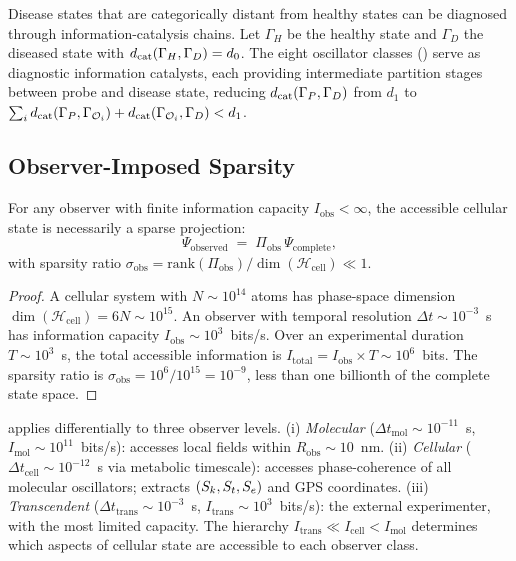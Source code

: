 \begin{corollary}
Disease states that are categorically distant from healthy states can be
diagnosed through information-catalysis chains.  Let $\Gamma_H$ be the healthy
state and $\Gamma_D$ the diseased state with $d_{\mathrm{cat}}(\Gamma_H, \Gamma_D) = d_0$.
The eight oscillator classes () serve as
diagnostic information catalysts, each providing intermediate partition stages
between probe and disease state, reducing $d_{\mathrm{cat}}(\Gamma_P, \Gamma_D)$ from
$d_1$ to $\sum_i d_{\mathrm{cat}}(\Gamma_P, \Gamma_{\mathcal{O}_i}) + d_{\mathrm{cat}}(\Gamma_{\mathcal{O}_i}, \Gamma_D) < d_1$.
\end{corollary}

\subsection{Observer-Imposed Sparsity}

\begin{theorem}
\label{thm:observer-sparsity}
For any observer with finite information capacity $I_\mathrm{obs} < \infty$,
the accessible cellular state is necessarily a sparse projection:
\[
    \Psi_\mathrm{observed} \;=\; \Pi_\mathrm{obs}\,\Psi_\mathrm{complete},
\]
with sparsity ratio $\sigma_\mathrm{obs} =
\mathrm{rank}(\Pi_\mathrm{obs})/\dim(\mathcal{H}_\mathrm{cell}) \ll 1$.
\end{theorem}

\begin{proof}
A cellular system with $N \sim 10^{14}$ atoms has phase-space dimension
$\dim(\mathcal{H}_\mathrm{cell}) = 6N \sim 10^{15}$.  An observer with
temporal resolution $\Delta t \sim 10^{-3}$~s has information capacity
$I_\mathrm{obs} \sim 10^3$~bits/s.  Over an experimental duration
$T \sim 10^3$~s, the total accessible information is
$I_\mathrm{total} = I_\mathrm{obs} \times T \sim 10^6$~bits.  The sparsity
ratio is $\sigma_\mathrm{obs} = 10^6/10^{15} = 10^{-9}$, less than one
billionth of the complete state space.
\end{proof}

\begin{remark}
 applies differentially to three observer levels.
(i) \emph{Molecular} ($\Delta t_\mathrm{mol} \sim 10^{-11}$~s,
$I_\mathrm{mol} \sim 10^{11}$~bits/s): accesses local fields within
$R_\mathrm{obs} \sim 10$~nm.  (ii) \emph{Cellular} ($\Delta t_\mathrm{cell}
\sim 10^{-12}$~s via metabolic timescale): accesses phase-coherence of all
molecular oscillators; extracts $(S_k, S_t, S_e)$ and GPS coordinates.  (iii)
\emph{Transcendent} ($\Delta t_\mathrm{trans} \sim 10^{-3}$~s, $I_\mathrm{trans}
\sim 10^3$~bits/s): the external experimenter, with the most limited capacity.
The hierarchy $I_\mathrm{trans} \ll I_\mathrm{cell} < I_\mathrm{mol}$ determines
which aspects of cellular state are accessible to each observer class.
\end{remark}

